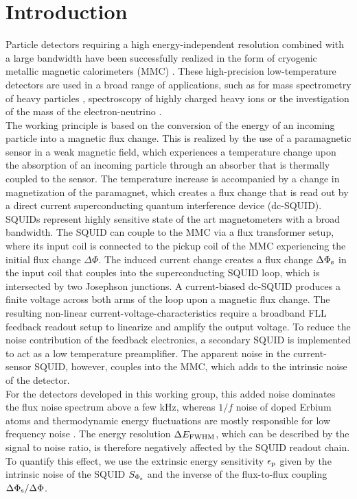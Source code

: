\chapter{Introduction}

Particle detectors requiring a high energy-independent resolution combined with a large bandwidth have been successfully realized in the form of cryogenic metallic magnetic calorimeters (MMC) \cite{Enss2005a}. These high-precision low-temperature detectors are used in a broad range of applications, such as for mass spectrometry of heavy particles \cite{Hengstler2017}, spectroscopy of highly charged heavy ions \cite{Gamer2019} or the investigation of the mass of the electron-neutrino \cite{Gastaldo2017}. \\
The working principle is based on the conversion of the energy of an incoming particle into a magnetic flux change. This is realized by the use of a paramagnetic sensor in a weak magnetic field, which experiences a temperature change upon the absorption of an incoming particle through an absorber that is thermally coupled to the sensor. The temperature increase is accompanied by a change in magnetization of the paramagnet, which creates a flux change that is read out by a direct current superconducting quantum interference device (dc-SQUID). SQUIDs represent highly sensitive state of the art magnetometers with a broad bandwidth. The SQUID can couple to the MMC via a flux transformer setup, where its input coil is connected to the pickup coil of the MMC experiencing the initial flux change $\Delta\Phi$. The induced current change creates a flux change $\Delta\Phi_{\rm s}$ in the input coil that couples into the superconducting SQUID loop, which is intersected by two Josephson junctions. A current-biased dc-SQUID produces a finite voltage across both arms of the loop upon a magnetic flux change. The resulting non-linear current-voltage-characteristics require a broadband FLL feedback readout setup to linearize and amplify the output voltage. To reduce the noise contribution of the feedback electronics, a secondary SQUID is implemented to act as a low temperature preamplifier. The apparent noise in the current-sensor SQUID, however, couples into the MMC, which adds to the intrinsic noise of the detector. \\
For the detectors developed in this working group, this added noise dominates the flux noise spectrum above a few kHz, whereas $1/f$ noise of doped Erbium atoms and thermodynamic energy fluctuations are mostly responsible for low frequency noise \cite{Kempf2018}. The energy resolution $\Delta E_{\rm FWHM}$, which can be described by the signal to noise ratio, is therefore negatively affected by the SQUID readout chain. To quantify this effect, we use the extrinsic energy sensitivity $\epsilon_{\rm p}$ given by the intrinsic noise of the SQUID $S_{\Phi_{\rm s}}$ and the inverse of the flux-to-flux coupling $\Delta\Phi_{\rm s}/\Delta\Phi$. \\

